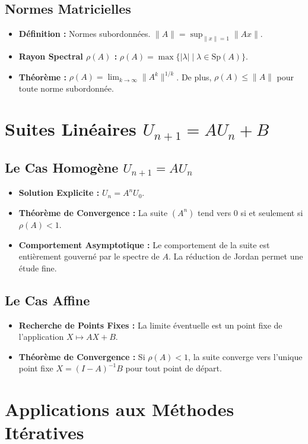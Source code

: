 \documentclass[12pt, a4paper, parskip=full]{report}
\theoremstyle{agregstyle}
\begin{document}
\subsection{Normes Matricielles}
\begin{itemize}
    \item \textbf{Définition :} Normes subordonnées. $\|A\| = \sup_{\|x\|=1} \|Ax\|$.
    \item \textbf{Rayon Spectral $\rho(A)$ :} $\rho(A) = \max\{|\lambda| \mid \lambda \in \mathrm{Sp}(A)\}$.
    \item \textbf{Théorème :} $\rho(A) = \lim_{k \to \infty} \|A^k\|^{1/k}$. De plus, $\rho(A) \le \|A\|$ pour toute norme subordonnée.
\end{itemize}

\section{Suites Linéaires $U_{n+1} = A U_n + B$}
\subsection{Le Cas Homogène $U_{n+1}=AU_n$}
\begin{itemize}
    \item \textbf{Solution Explicite :} $U_n = A^n U_0$.
    \item \textbf{Théorème de Convergence :} La suite $(A^n)$ tend vers 0 si et seulement si $\rho(A)<1$.
    \item \textbf{Comportement Asymptotique :} Le comportement de la suite est entièrement gouverné par le spectre de $A$. La réduction de Jordan permet une étude fine.
\end{itemize}
\subsection{Le Cas Affine}
\begin{itemize}
    \item \textbf{Recherche de Points Fixes :} La limite éventuelle est un point fixe de l'application $X \mapsto AX+B$.
    \item \textbf{Théorème de Convergence :} Si $\rho(A)<1$, la suite converge vers l'unique point fixe $X = (I-A)^{-1}B$ pour tout point de départ.
\end{itemize}

\section{Applications aux Méthodes Itératives}
\end{document}
